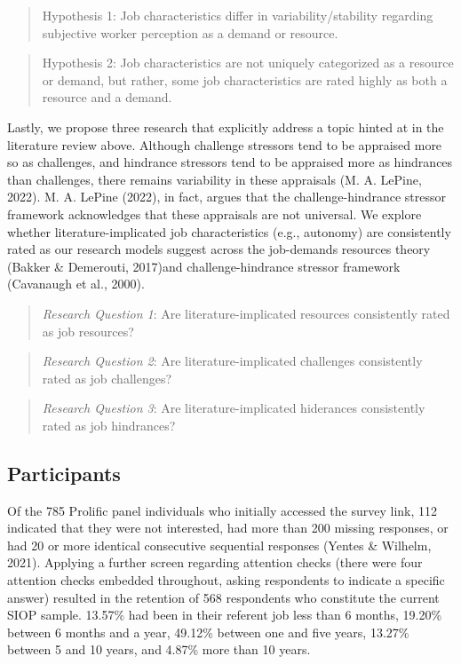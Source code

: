 \documentclass[
  english,
  man]{apa6}
\begin{document}
\begin{quote}
Hypothesis 1: Job characteristics differ in variability/stability regarding subjective worker perception as a demand or resource.
\end{quote}

\begin{quote}
Hypothesis 2: Job characteristics are not uniquely categorized as a resource or demand, but rather, some job characteristics are rated highly as both a resource and a demand.
\end{quote}

Lastly, we propose three research that explicitly address a topic hinted at in the literature review above. Although challenge stressors tend to be appraised more so as challenges, and hindrance stressors tend to be appraised more as hindrances than challenges, there remains variability in these appraisals (M. A. LePine, 2022). M. A. LePine (2022), in fact, argues that the challenge-hindrance stressor framework acknowledges that these appraisals are not universal. We explore whether literature-implicated job characteristics (e.g., autonomy) are consistently rated as our research models suggest across the job-demands resources theory (Bakker \& Demerouti, 2017)and challenge-hindrance stressor framework (Cavanaugh et al., 2000).

\begin{quote}
\emph{Research Question 1}: Are literature-implicated resources consistently rated as job resources?
\end{quote}

\begin{quote}
\emph{Research Question 2}: Are literature-implicated challenges consistently rated as job challenges?
\end{quote}

\begin{quote}
\emph{Research Question 3}: Are literature-implicated hiderances consistently rated as job hindrances?
\end{quote}

\hypertarget{participants}{%
\subsection{Participants}\label{participants}}

Of the 785 Prolific panel individuals who initially accessed the survey link, 112 indicated that they were not interested, had more than 200 missing responses, or had 20 or more identical consecutive sequential responses (Yentes \& Wilhelm, 2021). Applying a further screen regarding attention checks (there were four attention checks embedded throughout, asking respondents to indicate a specific answer) resulted in the retention of 568 respondents who constitute the current SIOP sample. 13.57\% had been in their referent job less than 6 months, 19.20\% between 6 months and a year, 49.12\% between one and five years, 13.27\% between 5 and 10 years, and 4.87\% more than 10 years.
\end{document}
